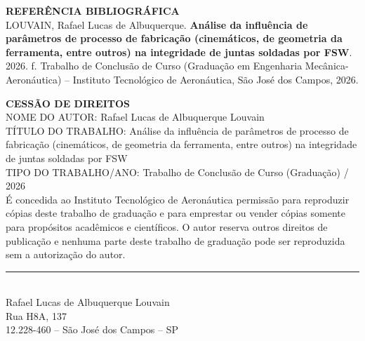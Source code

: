 \documentclass[12pt,openany]{report}
\begin{document}
\vspace{1cm}
\begin{singlespace}
\noindent\textbf{REFERÊNCIA BIBLIOGRÁFICA}\\[4pt]
LOUVAIN, Rafael Lucas de Albuquerque. \textbf{Análise da influência de parâmetros de processo de fabricação (cinemáticos, de geometria da ferramenta, entre outros) na integridade de juntas soldadas por FSW}. 2026. \pageref{LastPage}f. Trabalho de Conclusão de Curso (Graduação em Engenharia Mecânica-Aeronáutica) -- Instituto Tecnológico de Aeronáutica, São José dos Campos, 2026.

\vspace{0.8cm}
\noindent\textbf{CESSÃO DE DIREITOS}\\[4pt]
{\footnotesize NOME DO AUTOR:} Rafael Lucas de Albuquerque Louvain\\
{\footnotesize TÍTULO DO TRABALHO:} Análise da influência de parâmetros de processo de fabricação (cinemáticos, de geometria da ferramenta, entre outros) na integridade de juntas soldadas por FSW\\
{\footnotesize TIPO DO TRABALHO/ANO:} Trabalho de Conclusão de Curso (Graduação) / 2026\\[6pt]
É concedida ao Instituto Tecnológico de Aeronáutica permissão para reproduzir cópias deste trabalho de graduação e para emprestar ou vender cópias somente para propósitos acadêmicos e científicos. O autor reserva outros direitos de publicação e nenhuma parte deste trabalho de graduação pode ser reproduzida sem a autorização do autor.

\vspace{4cm}
\noindent\rule{7cm}{0.4pt}\\
Rafael Lucas de Albuquerque Louvain\\
Rua H8A, 137\\
12.228-460 -- São José dos Campos -- SP
\end{singlespace}
\newpage
\end{document}
